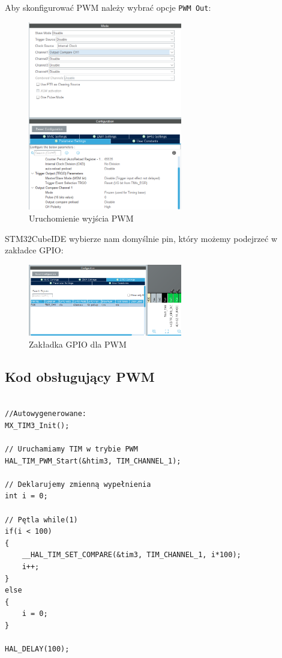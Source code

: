 \documentclass[11pt, a4paper]{article}
\begin{document}
Aby skonfigurować PWM należy wybrać opcje \texttt{PWM Out}:

\begin{figure}[h!]
    \centering
    \includegraphics[width=0.6\textwidth]{IMAGES/tim_pwm_konf.png}
    \caption{Uruchomienie wyjścia PWM}
\end{figure}

STM32CubeIDE wybierze nam domyślnie pin, który możemy podejrzeć w zakładce GPIO:

\begin{figure}[h!]
    \centering
    \includegraphics[width=0.6\textwidth]{IMAGES/tim_pwm_pin.png}
    \caption{Zakładka GPIO dla PWM}
\end{figure}

\newpage

\subsection* {Kod obsługujący PWM}
\begin{lstlisting}[style=lstC]

//Autowygenerowane:
MX_TIM3_Init();

// Uruchamiamy TIM w trybie PWM
HAL_TIM_PWM_Start(&htim3, TIM_CHANNEL_1);

// Deklarujemy zmienną wypełnienia
int i = 0;

// Pętla while(1)
if(i < 100)
{
    __HAL_TIM_SET_COMPARE(&tim3, TIM_CHANNEL_1, i*100);
    i++;
}
else
{
    i = 0;
}

HAL_DELAY(100);
\end{lstlisting}
\end{document}
